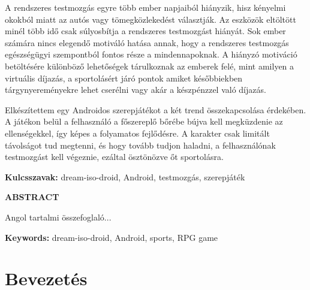 \documentclass[a4paper,oneside,10pt]{report}
\begin{document}
A rendszeres testmozgás egyre több ember napjaiból hiányzik, hisz kényelmi okokból miatt az autós vagy tömegközlekedést választják. 
Az eszközök eltöltött minél több idő csak súlyosbítja a rendszeres testmozgást hiányát. 
Sok ember számára nincs elegendő motiváló hatása annak, hogy a rendszeres testmozgás egészségügyi szempontból fontos része a mindennapoknak. 
A hiányzó motiváció betöltésére különböző lehetőségek tárulkoznak az emberek felé, mint amilyen a virtuális díjazás, a sportolásért járó pontok amiket későbbiekben tárgynyereményekre lehet cserélni vagy akár a készpénzzel való díjazás. 

Elkészítettem egy Androidos szerepjátékot a két trend összekapcsolása érdekében. 
A játékon belül a felhasználó a főszereplő bőrébe bújva kell megküzdenie az ellenségekkel, így képes a folyamatos fejlődésre. 
A karakter csak limitált távolságot tud megtenni, és hogy tovább tudjon haladni, a felhasználónak testmozgást kell végeznie, ezáltal ösztönözve őt sportolásra. 

\textbf{Kulcsszavak:} dream-iso-droid, Android, testmozgás, szerepjáték

\newpage

\Large
\begin{center}
	\textbf{ABSTRACT}
\end{center}
\normalsize
\noindent
Angol tartalmi összefoglaló...

\textbf{Keywords:} dream-iso-droid, Android, sports, RPG game
\tableofcontents
\newpage
\listoffigures
\newpage






\pagestyle{plain} %

\chapter{Bevezetés}
\label{bev}

\end{document}
